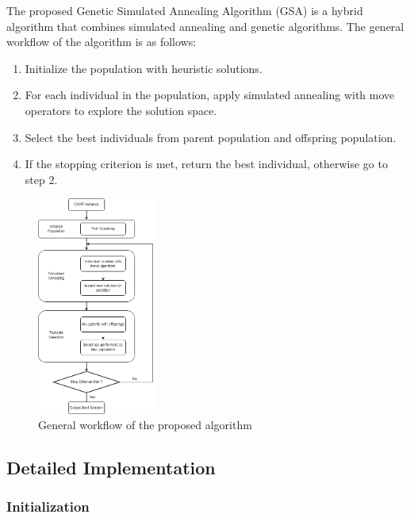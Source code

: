 \documentclass[conference]{IEEEtran}
\begin{document}
The proposed Genetic Simulated Annealing Algorithm (GSA) is a hybrid algorithm that combines simulated annealing and genetic algorithms.
The general workflow of the algorithm is as follows:
\begin{enumerate}
    \item Initialize the population with heuristic solutions.
    \item For each individual in the population, apply simulated annealing with move operators to explore the solution space.
    \item Select the best individuals from parent population and offspring population.
    \item If the stopping criterion is met, return the best individual, otherwise go to step 2.
\end{enumerate}

\begin{figure}[h]
    \centering
    \includegraphics[width=0.35\textwidth]{flow chart.png}
    \caption{General workflow of the proposed algorithm}
    \label{fig:flowchart}
\end{figure}

\subsection{Detailed Implementation} 

\subsubsection{Initialization}
\end{document}
